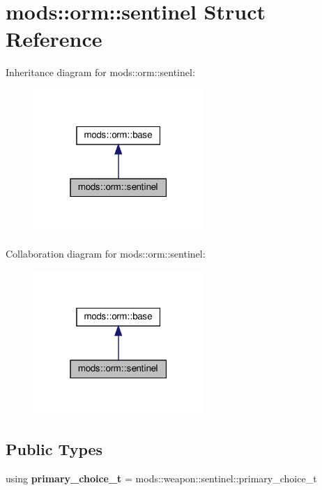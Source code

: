 \hypertarget{structmods_1_1orm_1_1sentinel}{}\section{mods\+:\+:orm\+:\+:sentinel Struct Reference}
\label{structmods_1_1orm_1_1sentinel}


Inheritance diagram for mods\+:\+:orm\+:\+:sentinel\+:\nopagebreak
\begin{figure}[H]
\begin{center}
\leavevmode
\includegraphics[width=183pt]{structmods_1_1orm_1_1sentinel__inherit__graph}
\end{center}
\end{figure}


Collaboration diagram for mods\+:\+:orm\+:\+:sentinel\+:\nopagebreak
\begin{figure}[H]
\begin{center}
\leavevmode
\includegraphics[width=183pt]{structmods_1_1orm_1_1sentinel__coll__graph}
\end{center}
\end{figure}
\subsection*{Public Types}
\begin{DoxyCompactItemize}
\item 
\mbox{\label{structmods_1_1orm_1_1sentinel_a9de7b9c1346aa8fb150325bb24f5a71c}} 
using {\bfseries primary\+\_\+choice\+\_\+t} = mods\+::weapon\+::sentinel\+::primary\+\_\+choice\+\_\+t
\end{DoxyCompactItemize}
